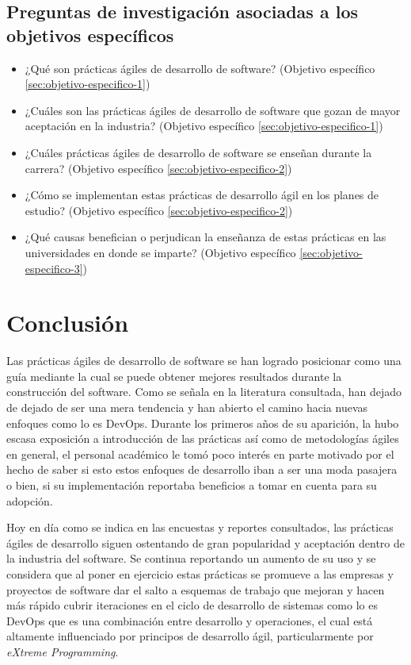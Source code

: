 \documentclass[journal]{IEEEtran}
\begin{document}
\subsection{Preguntas de investigación asociadas a los objetivos específicos}
\begin{itemize}
    \item ¿Qué son prácticas ágiles de desarrollo de software? (Objetivo específico \ref{sec:objetivo-especifico-1})
    \item ¿Cuáles son las prácticas ágiles de desarrollo de software que gozan de mayor aceptación en la industria? (Objetivo específico \ref{sec:objetivo-especifico-1})
    \item ¿Cuáles prácticas ágiles de desarrollo de software se enseñan durante la carrera? (Objetivo específico \ref{sec:objetivo-especifico-2})
    \item ¿Cómo se implementan estas prácticas de desarrollo ágil en los planes de estudio? (Objetivo específico \ref{sec:objetivo-especifico-2})
    \item ¿Qué causas benefician o perjudican la enseñanza de estas prácticas en las universidades en donde se imparte? (Objetivo específico \ref{sec:objetivo-especifico-3})
\end{itemize}


\section{Conclusión} \label{sec:conclusion}
Las prácticas ágiles de desarrollo de software se han logrado posicionar como una guía mediante la cual se puede obtener mejores resultados durante la construcción del software. Como se señala en la literatura consultada, han dejado de dejado de ser una mera tendencia y han abierto el camino hacia nuevas enfoques como lo es DevOps. Durante los primeros años de su aparición, la hubo escasa exposición a introducción de las prácticas así como de metodologías ágiles en general, el personal académico le tomó poco interés en parte motivado por el hecho de saber si esto estos enfoques de desarrollo iban a ser una moda pasajera o bien, si su implementación reportaba beneficios a tomar en cuenta para su adopción.

Hoy en día como se indica en las encuestas y reportes consultados, las prácticas ágiles de desarrollo siguen ostentando de gran popularidad y aceptación dentro de la industria del software. Se continua reportando un aumento de su uso y se considera que al poner en ejercicio estas prácticas se promueve a las empresas y proyectos de software dar el salto a esquemas de trabajo que mejoran y hacen más rápido cubrir iteraciones en el ciclo de desarrollo de sistemas como lo es DevOps que es una combinación entre desarrollo y operaciones, el cual está altamente influenciado por principos de desarrollo ágil, particularmente por \emph{eXtreme Programming}.
\end{document}
